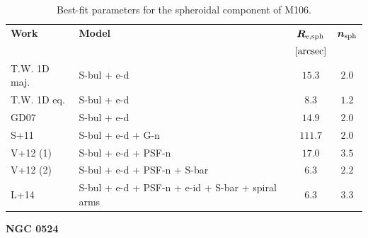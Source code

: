 \documentclass[preprint2]{emulateapj}
\begin{document}
  \begin{table}[h]
  \small
  \caption{Best-fit parameters for the spheroidal component of M106.}
  \begin{center}
  \begin{tabular}{llcc}
  \hline
  {\bf Work} & {\bf Model}   & $\bm R_{\rm e,sph}$    & $\bm n_{\rm sph}$ \\
    &  &  $[\rm arcsec]$ & \\
  \hline
  T.W. 1D maj. & S-bul + e-d & $15.3$  &  $2.0$ \\
  T.W. 1D eq.  & S-bul + e-d & $8.3$   &  $1.2$ \\
  \hline
  GD07     & S-bul + e-d		 & $14.9$   &  $2.0$ \\
  S+11     & S-bul + e-d + G-n  	 & $111.7$  &  $2.0$ \\
  V+12 (1) & S-bul + e-d + PSF-n	 & $17.0$   &  $3.5$ \\
  V+12 (2) & S-bul + e-d + PSF-n + S-bar & $6.3$    &  $2.2$ \\
  L+14     & S-bul + e-d + PSF-n + e-id + S-bar + spiral arms & $6.3$	 &  $3.3$ \\
  \hline
  \end{tabular}
  \end{center}
  \label{tab:m106}
  \end{table}


  \clearpage\newpage\noindent
  {\bf NGC 0524 \\} 
\end{document}

